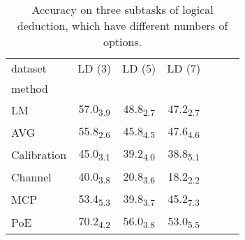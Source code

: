\begin{table}[h]
\centering
\caption{Accuracy on three subtasks of logical deduction, which have different numbers of options.}
\label{tab:num_option}
\begin{tabular}{lcccccc}
dataset & LD (3) & LD (5) & LD (7) \\
method &  &  &  \\
LM & 57.0\textsubscript{3.9} & 48.8\textsubscript{2.7} & 47.2\textsubscript{2.7} \\
AVG & 55.8\textsubscript{2.6} & 45.8\textsubscript{4.5} & 47.6\textsubscript{4.6} \\
Calibration & 45.0\textsubscript{3.1} & 39.2\textsubscript{4.0} & 38.8\textsubscript{5.1} \\
Channel & 40.0\textsubscript{3.8} & 20.8\textsubscript{3.6} & 18.2\textsubscript{2.2} \\
MCP & 53.4\textsubscript{5.3} & 39.8\textsubscript{3.7} & 45.2\textsubscript{7.3} \\
PoE & 70.2\textsubscript{4.2} & 56.0\textsubscript{3.8} & 53.0\textsubscript{5.5} \\
\end{tabular}
\end{table}
